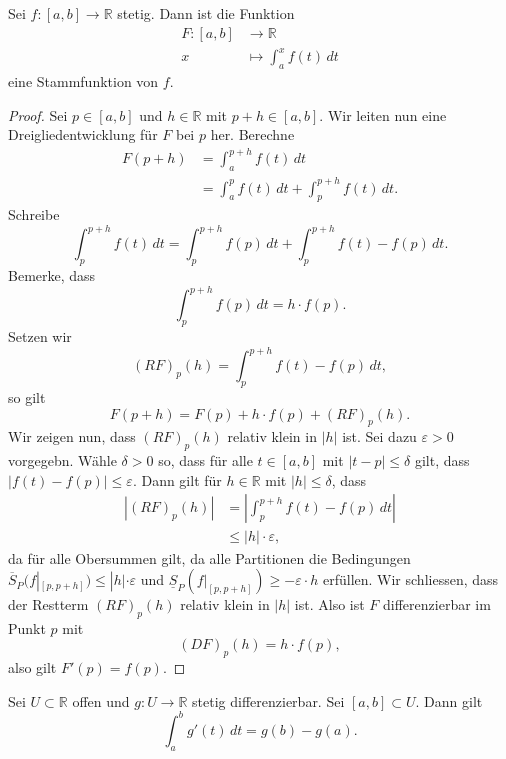 \documentclass[../main.tex]{subfiles}
\begin{document}
\begin{theorem}\label{thm:fundamental}
  Sei $f \colon [a, b] \to \mathbb{R}$ stetig.
  Dann ist die Funktion
  \begin{align*}
    F \colon [a, b] & \to \mathbb{R} \\
    x & \mapsto \int_{a}^{x} f(t) \, dt
  \end{align*}
  eine Stammfunktion von $f$.
\end{theorem}

\begin{proof}
  Sei $p \in [a, b]$ und $h \in \mathbb{R}$ 
  mit $p + h \in [a, b]$.
  Wir leiten nun eine Dreigliedentwicklung
  für $F$ bei $p$ her. Berechne
  \begin{align*}
    F(p+h)
    &= \int_{a}^{p+h} f(t) \, dt\\
    &= \int_{a}^{p} f(t) \, dt
    + \int_{p}^{p+h} f(t) \, dt.
  \end{align*}
  Schreibe
  \[
    \int_{p}^{p+h} f(t) \, dt
    = \int_{p}^{p+h} f(p) \, dt
    + \int_{p}^{p+h} f(t) - f(p) \, dt.
  \]
  Bemerke, dass
  \[
    \int_{p}^{p+h} f(p) \, dt = h \cdot f(p).
  \]
  Setzen wir
  \[
    {(RF)}_p(h) = \int_{p}^{p+h} f(t) - f(p) \, dt,
  \]
  so gilt
  \[
    F(p + h) = F(p) + h \cdot f(p) + {(RF)}_p(h).
  \]
  Wir zeigen nun, dass ${(RF)}_p(h)$ relativ klein in $|h|$ ist.
  Sei dazu $\varepsilon > 0$ vorgegebn.
  Wähle $\delta > 0$ so, dass für alle
  $t \in [a, b]$ mit $|t - p| \leq \delta$ gilt,
  dass $|f(t) - f(p)| \leq \varepsilon$.
  Dann gilt für $h \in \mathbb{R}$ mit $|h| \leq \delta$,
  dass
  \begin{align*}
    |{(RF)}_p(h)|
    & = \left| \int_{p}^{p+h} f(t) - f(p) \, dt \right|\\
    & \leq |h| \cdot \varepsilon,
  \end{align*}
  da für alle Obersummen gilt, da alle Partitionen
  die Bedingungen
  $\overline S_P(f|_{[p, p+h]}) \leq |h| \cdot \varepsilon$
  und $\underline S_P(f|_{[p, p+h]}) \geq - \varepsilon \cdot h$ 
  erfüllen.
  Wir schliessen, dass der Restterm
  ${(RF)}_p(h)$ relativ klein in $|h|$ ist.
  Also ist $F$ differenzierbar im Punkt $p$ mit
  \[
    {(DF)}_p(h) = h \cdot f(p),
  \]
  also gilt $F'(p) = f(p)$.
\end{proof}

\begin{application}
  Sei $U \subset \mathbb{R}$ offen und $g \colon U \to \mathbb{R}$ 
  stetig differenzierbar. Sei $[a, b] \subset U$.
  Dann gilt
  \[
    \int_{a}^{b} g'(t) \, dt = g(b) - g(a).
  \]
\end{application}
\end{document}
